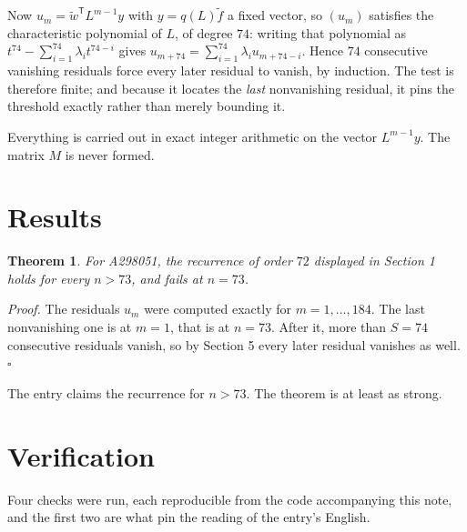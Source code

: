 \documentclass[11pt]{article}
\newtheorem{theorem}{Theorem}
\theoremstyle{definition}
\begin{document}
Now $u_m = \tilde w^{\mathsf T} L^{m-1} y$ with $y = q(L)\tilde f$ a fixed vector, so $(u_m)$ satisfies the characteristic polynomial of $L$, of degree $74$: writing that polynomial as $t^{74} - \sum_{i=1}^{74} \lambda_i t^{74-i}$ gives $u_{m+74} = \sum_{i=1}^{74} \lambda_i u_{m+74-i}$. Hence $74$ consecutive vanishing residuals force every later residual to vanish, by induction. The test is therefore finite; and because it locates the {\itshape last} nonvanishing residual, it pins the threshold exactly rather than merely bounding it.

Everything is carried out in exact integer arithmetic on the vector $L^{m-1}y$. The matrix $M$ is never formed.

\section{Results}

\begin{theorem} For A298051, the recurrence of order $72$ displayed in Section 1 holds for every $n > 73$, and fails at $n = 73$.\end{theorem}

{\itshape Proof.} The residuals $u_m$ were computed exactly for $m = 1,\dots,184$. The last nonvanishing one is at $m = 1$, that is at $n = 73$. After it, more than $S = 74$ consecutive residuals vanish, so by Section 5 every later residual vanishes as well. $\square$

The entry claims the recurrence for $n > 73$. The theorem is at least as strong.

\section{Verification}

Four checks were run, each reproducible from the code accompanying this note, and the first two are what pin the reading of the entry's English.
\end{document}
